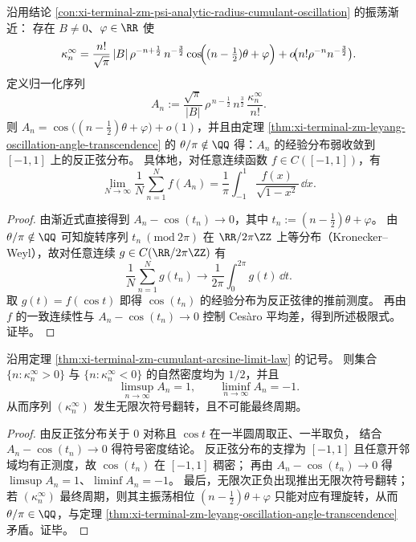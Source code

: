 \begin{theorem}[归一化高阶累积量密度的反正弦极限律]\label{thm:xi-terminal-zm-cumulant-arcsine-limit-law}
沿用结论 \ref{con:xi-terminal-zm-psi-analytic-radius-cumulant-oscillation} 的振荡渐近：
存在 \(B\neq 0\)、\(\varphi\in\RR\) 使
\[
\kappa_n^\infty
=\frac{n!}{\sqrt\pi}\,|B|\,\rho^{-n+\frac12}\,n^{-\frac32}
\cos\!\Bigl((n-\tfrac12)\theta+\varphi\Bigr)
+o\!\bigl(n!\rho^{-n}n^{-\frac32}\bigr).
\]
定义归一化序列
\[
A_n:=\frac{\sqrt\pi}{|B|}\,\rho^{\,n-\frac12}\,n^{\frac32}\,\frac{\kappa_n^\infty}{n!}.
\]
则 \(A_n=\cos\!\bigl((n-\tfrac12)\theta+\varphi\bigr)+o(1)\)，并且由定理 \ref{thm:xi-terminal-zm-leyang-oscillation-angle-transcendence} 的 \(\theta/\pi\notin\QQ\) 得：\(A_n\) 的经验分布弱收敛到 \([-1,1]\) 上的反正弦分布。
具体地，对任意连续函数 \(f\in C([-1,1])\)，有
\[
\lim_{N\to\infty}\frac1N\sum_{n=1}^{N} f(A_n)
=\frac{1}{\pi}\int_{-1}^{1}\frac{f(x)}{\sqrt{1-x^2}}\,\dd x.
\]
\end{theorem}
\begin{proof}
由渐近式直接得到 \(A_n-\cos(t_n)\to 0\)，其中 \(t_n:=(n-\tfrac12)\theta+\varphi\)。
由 \(\theta/\pi\notin\QQ\) 可知旋转序列 \(t_n\ (\mathrm{mod}\ 2\pi)\) 在 \(\RR/2\pi\ZZ\) 上等分布（Kronecker--Weyl），故对任意连续 \(g\in C(\RR/2\pi\ZZ)\) 有
\[
\frac1N\sum_{n=1}^{N} g(t_n)\to \frac{1}{2\pi}\int_{0}^{2\pi} g(t)\,\dd t.
\]
取 \(g(t)=f(\cos t)\) 即得 \(\cos(t_n)\) 的经验分布为反正弦律的推前测度。\cite{KuipersNiederreiter1974}
再由 \(f\) 的一致连续性与 \(A_n-\cos(t_n)\to 0\) 控制 Ces\`aro 平均差，得到所述极限式。证毕。
\end{proof}

\begin{corollary}\label{cor:xi-terminal-zm-cumulant-sign-density-extremes}
沿用定理 \ref{thm:xi-terminal-zm-cumulant-arcsine-limit-law} 的记号。
则集合 \(\{n:\kappa_n^\infty>0\}\) 与 \(\{n:\kappa_n^\infty<0\}\) 的自然密度均为 \(1/2\)，并且
\[
\limsup_{n\to\infty}A_n=1,\qquad \liminf_{n\to\infty}A_n=-1.
\]
从而序列 \((\kappa_n^\infty)\) 发生无限次符号翻转，且不可能最终周期。
\end{corollary}
\begin{proof}
由反正弦分布关于 \(0\) 对称且 \(\cos t\) 在一半圆周取正、一半取负，
结合 \(A_n-\cos(t_n)\to 0\) 得符号密度结论。
反正弦分布的支撑为 \([-1,1]\) 且任意开邻域均有正测度，故 \(\cos(t_n)\) 在 \([-1,1]\) 稠密；
再由 \(A_n-\cos(t_n)\to 0\) 得 \(\limsup A_n=1\)、\(\liminf A_n=-1\)。
最后，无限次正负出现推出无限次符号翻转；若 \((\kappa_n^\infty)\) 最终周期，则其主振荡相位 \((n-\tfrac12)\theta+\varphi\) 只能对应有理旋转，从而 \(\theta/\pi\in\QQ\)，与定理 \ref{thm:xi-terminal-zm-leyang-oscillation-angle-transcendence} 矛盾。证毕。
\end{proof}

